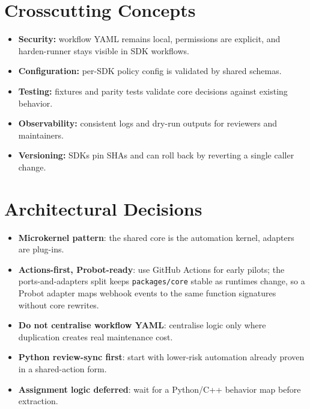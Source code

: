 \documentclass[10pt, a4paper]{article}
\begin{document}
\section{Crosscutting Concepts}

\begin{itemize}
    \item \textbf{Security:} workflow YAML remains local, permissions are explicit, and harden-runner
        stays visible in SDK workflows.
    \item \textbf{Configuration:} per-SDK policy config is validated by shared schemas.
    \item \textbf{Testing:} fixtures and parity tests validate core decisions against existing behavior.
    \item \textbf{Observability:} consistent logs and dry-run outputs for reviewers and maintainers.
    \item \textbf{Versioning:} SDKs pin SHAs and can roll back by reverting a single caller change.
\end{itemize}

\section{Architectural Decisions}

\begin{itemize}
  \item \textbf{Microkernel pattern}: the shared core is the automation kernel, adapters are plug-ins.
  \item \textbf{Actions-first, Probot-ready}: use GitHub Actions for early pilots; the
        ports-and-adapters split keeps \texttt{packages/core} stable as runtimes change, so a
        Probot adapter maps webhook events to the same function signatures without core rewrites.
  \item \textbf{Do not centralise workflow YAML}: centralise logic only where duplication creates
        real maintenance cost.
  \item \textbf{Python review-sync first}: start with lower-risk automation already proven in a
        shared-action form.
  \item \textbf{Assignment logic deferred}: wait for a Python/C++ behavior map before extraction.
\end{itemize}
\end{document}
